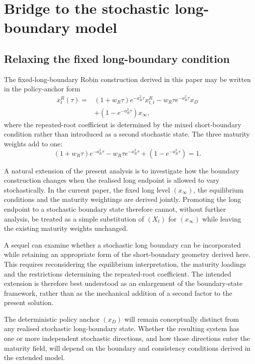 \documentclass[12pt]{article}
\numberwithin{equation}{subsection}
\begin{document}
\section{Bridge to the stochastic long-boundary model}

\subsection{Relaxing the fixed long-boundary condition}

The fixed-long-boundary Robin construction derived in this paper may be written in the policy-anchor form
\begin{equation}
\begin{aligned}
x^R_t(\tau)
={}&
(1+w_R\tau)e^{-a_R^2\tau}x^R_{t,t}
-w_R\tau e^{-a_R^2\tau}x_D
\\
&+
\left(1-e^{-a_R^2\tau}\right)x_\infty,
\end{aligned}
\end{equation}
where the repeated-root coefficient is determined by the mixed short-boundary condition rather than introduced as a second stochastic state. The three maturity weights add to one:
\begin{equation}
(1+w_R\tau)e^{-a_R^2\tau}
-w_R\tau e^{-a_R^2\tau}
+
\left(1-e^{-a_R^2\tau}\right)=1.
\end{equation}

A natural extension of the present analysis is to investigate how the boundary construction changes when the realised long endpoint is allowed to vary stochastically. In the current paper, the fixed long level $(x_\infty)$, the equilibrium conditions and the maturity weightings are derived jointly. Promoting the long endpoint to a stochastic boundary state therefore cannot, without further analysis, be treated as a simple substitution of $(X_t)$ for $(x_\infty)$ while leaving the existing maturity weights unchanged.

A sequel can examine whether a stochastic long boundary can be incorporated while retaining an appropriate form of the short-boundary geometry derived here. This requires reconsidering the equilibrium interpretation, the maturity loadings and the restrictions determining the repeated-root coefficient. The intended extension is therefore best understood as an enlargement of the boundary-state framework, rather than as the mechanical addition of a second factor to the present solution.

The deterministic policy anchor $(x_D)$ will remain conceptually distinct from any realised stochastic long-boundary state. Whether the resulting system has one or more independent stochastic directions, and how those directions enter the maturity field, will depend on the boundary and consistency conditions derived in the extended model.
\end{document}
